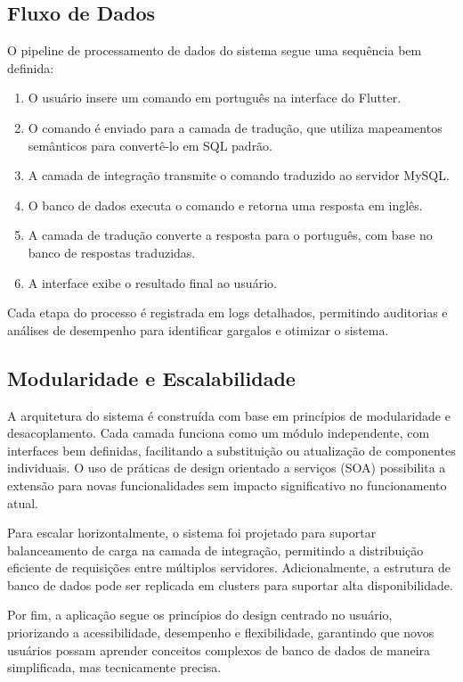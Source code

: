 \subsection{Fluxo de Dados}
O pipeline de processamento de dados do sistema segue uma sequência bem definida:

\begin{enumerate}
    \item O usuário insere um comando em português na interface do Flutter.
    \item O comando é enviado para a camada de tradução, que utiliza mapeamentos semânticos para convertê-lo em SQL padrão.
    \item A camada de integração transmite o comando traduzido ao servidor MySQL.
    \item O banco de dados executa o comando e retorna uma resposta em inglês.
    \item A camada de tradução converte a resposta para o português, com base no banco de respostas traduzidas.
    \item A interface exibe o resultado final ao usuário.
\end{enumerate}


Cada etapa do processo é registrada em logs detalhados, permitindo auditorias e análises de desempenho para identificar gargalos e otimizar o sistema.

\subsection{Modularidade e Escalabilidade}
A arquitetura do sistema é construída com base em princípios de modularidade e desacoplamento. Cada camada funciona como um módulo independente, com interfaces bem definidas, facilitando a substituição ou atualização de componentes individuais. O uso de práticas de design orientado a serviços (SOA) possibilita a extensão para novas funcionalidades sem impacto significativo no funcionamento atual.

Para escalar horizontalmente, o sistema foi projetado para suportar balanceamento de carga na camada de integração, permitindo a distribuição eficiente de requisições entre múltiplos servidores. Adicionalmente, a estrutura de banco de dados pode ser replicada em clusters para suportar alta disponibilidade.

Por fim, a aplicação segue os princípios do design centrado no usuário, priorizando a acessibilidade, desempenho e flexibilidade, garantindo que novos usuários possam aprender conceitos complexos de banco de dados de maneira simplificada, mas tecnicamente precisa.


